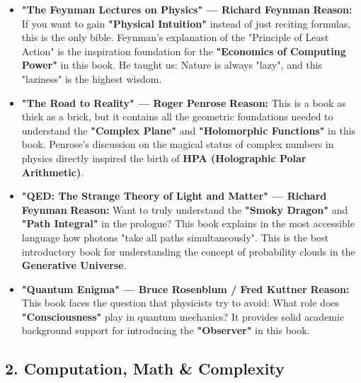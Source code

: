 \begin{itemize}
\item \textbf{"The Feynman Lectures on Physics" — Richard Feynman}
\textbf{Reason:} If you want to gain \textbf{"Physical Intuition"} instead of just reciting formulas, this is the only bible. Feynman's explanation of the "Principle of Least Action" is the inspiration foundation for the \textbf{"Economics of Computing Power"} in this book. He taught us: Nature is always "lazy", and this "laziness" is the highest wisdom.

\item \textbf{"The Road to Reality" — Roger Penrose}
\textbf{Reason:} This is a book as thick as a brick, but it contains all the geometric foundations needed to understand the \textbf{"Complex Plane"} and \textbf{"Holomorphic Functions"} in this book. Penrose's discussion on the magical status of complex numbers in physics directly inspired the birth of \textbf{HPA (Holographic Polar Arithmetic)}.

\item \textbf{"QED: The Strange Theory of Light and Matter" — Richard Feynman}
\textbf{Reason:} Want to truly understand the \textbf{"Smoky Dragon"} and \textbf{"Path Integral"} in the prologue? This book explains in the most accessible language how photons "take all paths simultaneously". This is the best introductory book for understanding the concept of probability clouds in the \textbf{Generative Universe}.

\item \textbf{"Quantum Enigma" — Bruce Rosenblum / Fred Kuttner}
\textbf{Reason:} This book faces the question that physicists try to avoid: What role does \textbf{"Consciousness"} play in quantum mechanics? It provides solid academic background support for introducing the \textbf{"Observer"} in this book.
\end{itemize}

\subsection*{2. Computation, Math \& Complexity}


